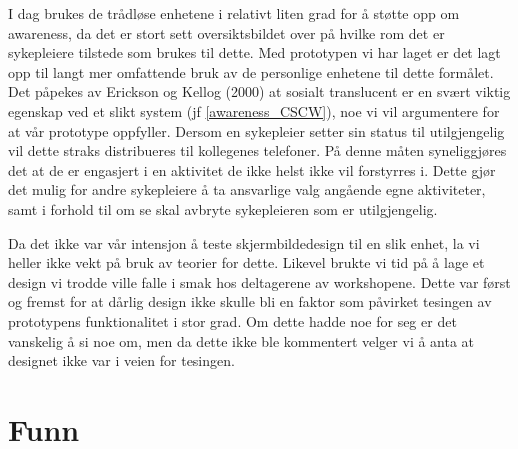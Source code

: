 \noindent
I dag brukes de trådløse enhetene i relativt liten grad for å støtte opp om awareness, da det er stort sett oversiktsbildet over på hvilke rom det er sykepleiere tilstede som brukes til dette. Med prototypen vi har laget er det lagt opp til langt mer omfattende bruk av de personlige enhetene til dette formålet. Det påpekes av Erickson og Kellog (2000) at sosialt translucent er en svært viktig egenskap ved et slikt system (jf \ref{awareness_CSCW}), noe vi vil argumentere for at vår prototype oppfyller.  Dersom en sykepleier setter sin status til utilgjengelig vil dette straks distribueres til kollegenes telefoner. På denne måten syneliggjøres det at de er engasjert i en aktivitet de ikke helst ikke vil forstyrres i. Dette gjør det mulig for andre sykepleiere å ta ansvarlige valg angående egne aktiviteter, samt i forhold til om se skal avbryte sykepleieren som er utilgjengelig. 

\noindent
Da det ikke var vår intensjon å teste skjermbildedesign til en slik enhet, la vi heller ikke vekt på bruk av teorier for dette. Likevel brukte vi tid på å lage et design vi trodde ville falle i smak hos deltagerene av workshopene. Dette var først og fremst for at dårlig design ikke skulle bli en faktor som påvirket tesingen av prototypens funktionalitet i stor grad. Om dette hadde noe for seg er det vanskelig å si noe om, men da dette ikke ble kommentert velger vi å anta at designet ikke var i veien for tesingen.

\section{Funn}

